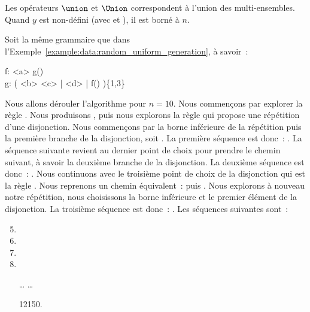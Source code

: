 Les opérateurs $\union$ et $\Union$ correspondent à l'union des multi-ensembles.
Quand $y$ est non-défini (avec \code{*} et \code{+}), il est borné à $n$.

\begin{example}
\label{example:data:bounded_exhaustive_generation}

Soit la même grammaire que dans
l'Exemple~\ref{example:data:random_uniform_generation}, à savoir~:

\begin{pre}
f: <a> g() \\
g: ( <b> <c> | <d> | f() )\{1,3\}
\end{pre}

Nous allons dérouler l'algorithme pour $n = 10$. Nous commençons par explorer la
règle . Nous produisons , puis nous explorons la règle
 qui propose une répétition d'une disjonction.  Nous commençons par la
borne inférieure de la répétition puis la première branche de la disjonction,
soit . La première séquence est donc~: . La
séquence suivante revient au dernier point de choix pour prendre le chemin
suivant, à savoir la deuxième branche de la disjonction. La deuxième séquence
est donc~: . Nous continuons avec le troisième point de choix de
la disjonction qui est la règle . Nous reprenons un chemin équivalent~:
 puis . Nous explorons à nouveau notre répétition, nous
choisissons la borne inférieure et le premier élément de la disjonction. La
troisième séquence est donc~: . Les séquences suivantes
sont~:

\begin{enumerate}
\setcounter{enumi}{4}

\item {}

\item {}

\item {}

\item {}

\item[…] …

\item[12150.] 

\end{enumerate}

\end{example}

